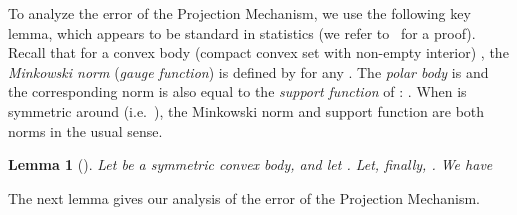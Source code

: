 \documentclass{article}
\newtheorem{lemma}{Lemma}[theorem]
\begin{document}
To analyze the error of the Projection Mechanism, we use the following
key lemma, which appears to be standard in statistics (we refer
to~\cite{NTZ,conjunctions} for a proof). Recall that for a convex body
(compact convex set with non-empty interior) , the
\emph{Minkowski norm} (\emph{gauge function}) is defined by  for any . The \emph{polar body} is  and the
corresponding norm is also equal to the \emph{support function} of
: . When  is symmetric around  (i.e.~), the Minkowski norm
and support function are both norms in the usual sense.

\begin{lemma}[\cite{NTZ,conjunctions}]\label{lm:lse}
  Let  be a symmetric convex body, and let . Let, finally, . We have 
\end{lemma}

The next lemma gives our analysis of the error of the Projection
Mechanism.
\end{document}
